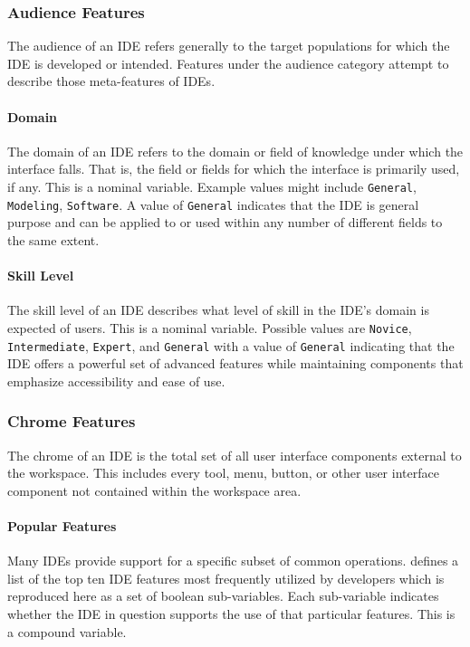 \subsubsection{Audience Features} \label{subsubsec:audience}

The audience of an IDE refers generally to the target populations for which
the IDE is developed or intended. Features under the audience category
attempt to describe those meta-features of IDEs.


\paragraph{Domain} The domain of an IDE refers to the domain or field of
knowledge under which the interface falls. That is, the field or fields for
which the interface is primarily used, if any. This is a nominal variable.
Example values might include \texttt{General}, \texttt{Modeling},
\texttt{Software}. A value of \texttt{General} indicates that the IDE is
general purpose and can be applied to or used within any number of
different fields to the same extent.


\paragraph{Skill Level} The skill level of an IDE describes what level of
skill in the IDE's domain is expected of users. This is a nominal variable.
Possible values are \texttt{Novice}, \texttt{Intermediate},
\texttt{Expert}, and \texttt{General} with a value of \texttt{General}
indicating that the IDE offers a powerful set of advanced features while
maintaining components that emphasize accessibility and ease of use.


\subsubsection{Chrome Features} \label{subsubsec:chrome}

The chrome of an IDE is the total set of all user interface components
external to the workspace. This includes every tool, menu, button, or other
user interface component not contained within the workspace area.


\paragraph{Popular Features} Many IDEs provide support for a specific
subset of common operations. \citeauthor{murphy2006} defines a list of the
top ten IDE features most frequently utilized by developers which is
reproduced here as a set of boolean sub-variables. Each sub-variable
indicates whether the IDE in question supports the use of that particular
features. This is a compound variable.

